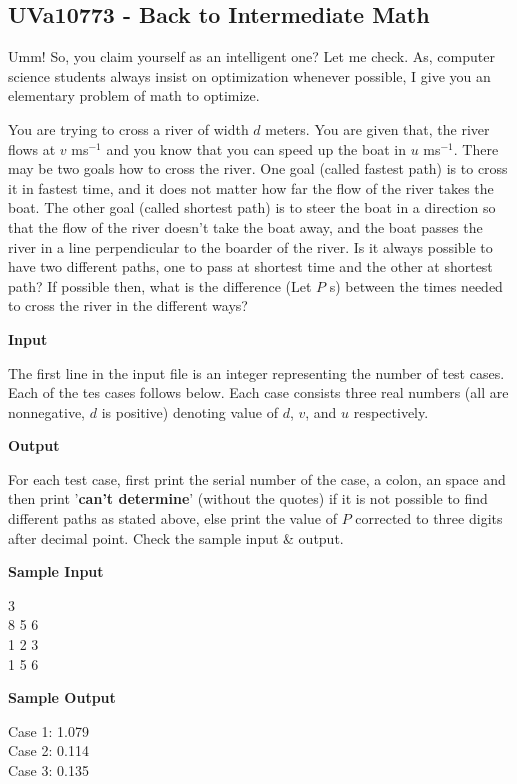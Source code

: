 \subsection{UVa10773 - Back to Intermediate Math}
Umm! So, you claim yourself as an intelligent one? Let me check. As, computer science students always insist on optimization whenever possible, I give you an elementary problem of math to optimize.

You are trying to cross a river of width $d$ meters. You are given that, the river flows at $v$ ms$^{-1}$ and you know that you can speed up the boat in $u$ ms$^{-1}$. There may be two goals how to cross the river. One goal (called fastest path) is to cross it in fastest time, and it does not matter how far the flow of the river takes the boat. The other goal (called shortest path) is to steer the boat in a direction so that the flow of the river doesn't take the boat away, and the boat passes the river in a line perpendicular to the boarder of the river. Is it always possible to have two different paths, one to pass at shortest time and the other at shortest path? If possible then, what is the difference (Let $P$ s) between the times needed to cross the river in the different ways?

\begin{flushleft}
{\color{red} \textbf{Input}}
\end{flushleft}
The first line in the input file is an integer representing the number of test cases. Each of the tes cases follows below. Each case consists three real numbers (all are nonnegative, $d$ is positive) denoting value of $d$, $v$, and $u$ respectively.

\begin{flushleft}
{\color{red} \textbf{Output}}
\end{flushleft}
For each test case, first print the serial number of the case, a colon, an space and then print '\textbf{can't determine}' (without the quotes) if it is not possible to find different paths as stated above, else print the value of $P$ corrected to three digits after decimal point. Check the sample input \& output.

\begin{flushleft}
{\color{red} \textbf{Sample Input}}
\end{flushleft}
\begin{flushleft}
3\\
8 5 6\\
1 2 3\\
1 5 6\\
\end{flushleft}

\begin{flushleft}
{\color{red} \textbf{Sample Output}}
\end{flushleft}
\begin{flushleft}
Case 1: 1.079\\
Case 2: 0.114\\
Case 3: 0.135\\
\end{flushleft}

\newpage